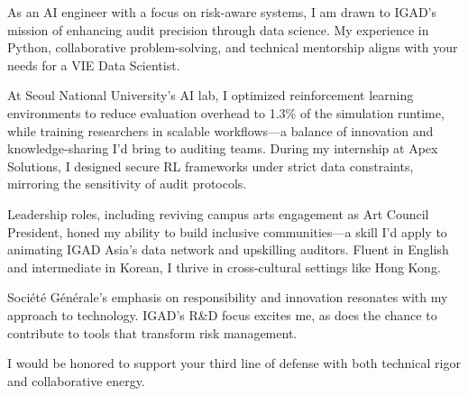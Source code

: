 
\newcommand{\Company}{Corsearch}
\recipient{\RecruitmentTeam{\Company}}{\Company\\Paris\\ France}
\makelettertitle

As an AI engineer with a focus on risk-aware systems, I am drawn to IGAD’s mission of enhancing audit precision through data science. My experience in Python, collaborative problem-solving, and technical mentorship aligns with your needs for a VIE Data Scientist.

At Seoul National University’s AI lab, I optimized reinforcement learning environments to reduce evaluation overhead to 1.3\% of the simulation runtime, while training researchers in scalable workflows—a balance of innovation and knowledge-sharing I’d bring to auditing teams. During my internship at Apex Solutions, I designed secure RL frameworks under strict data constraints, mirroring the sensitivity of audit protocols.

Leadership roles, including reviving campus arts engagement as Art Council President, honed my ability to build inclusive communities—a skill I’d apply to animating IGAD Asia’s data network and upskilling auditors. Fluent in English and intermediate in Korean, I thrive in cross-cultural settings like Hong Kong.

Société Générale’s emphasis on responsibility and innovation resonates with my approach to technology. IGAD’s R\&D focus excites me, as does the chance to contribute to tools that transform risk management.

I would be honored to support your third line of defense with both technical rigor and collaborative energy.


\makeletterclosing
